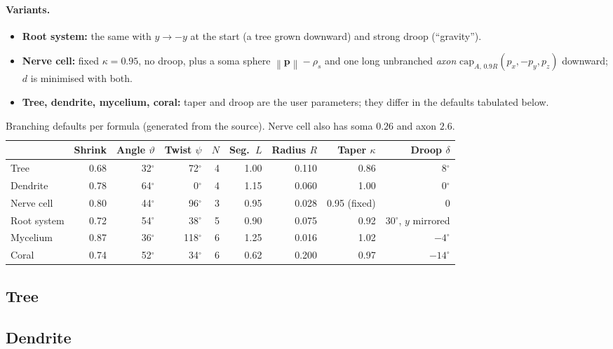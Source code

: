 \documentclass[10pt,a4paper]{article}
\newcommand{\vv}[1]{\mathbf{#1}}
\newcommand{\norm}[1]{\left\lVert#1\right\rVert}
\begin{document}
\paragraph{Variants.}
\begin{itemize}
\item \textbf{Root system:} the same with $y\to-y$ at the start (a tree grown downward) and strong droop (``gravity'').
\item \textbf{Nerve cell:} fixed $\kappa=0.95$, no droop, plus a soma sphere $\norm{\vv p}-\rho_s$ and one long unbranched \emph{axon} $\mathrm{cap}_{A,\,0.9R}(p_x,-p_y,p_z)$ downward; $d$ is minimised with both.
\item \textbf{Tree, dendrite, mycelium, coral:} taper and droop are the user parameters; they differ in the defaults tabulated below.
\end{itemize}

\begin{table}[H]\centering\footnotesize
\begin{tabular}{@{}lrrrrrrrr@{}}\toprule
 & Shrink & Angle $\vartheta$ & Twist $\psi$ & $N$ & Seg.\ $L$ & Radius $R$ & Taper $\kappa$ & Droop $\delta$\\\midrule
Tree & 0.68 & 32$^\circ$ & 72$^\circ$ & 4 & 1.00 & 0.110 & 0.86 & 8$^\circ$\\
Dendrite & 0.78 & 64$^\circ$ & 0$^\circ$ & 4 & 1.15 & 0.060 & 1.00 & 0$^\circ$\\
Nerve cell & 0.80 & 44$^\circ$ & 96$^\circ$ & 3 & 0.95 & 0.028 & 0.95 (fixed) & 0\\
Root system & 0.72 & 54$^\circ$ & 38$^\circ$ & 5 & 0.90 & 0.075 & 0.92 & 30$^\circ$, $y$ mirrored\\
Mycelium & 0.87 & 36$^\circ$ & 118$^\circ$ & 6 & 1.25 & 0.016 & 1.02 & $-4^\circ$\\
Coral & 0.74 & 52$^\circ$ & 34$^\circ$ & 6 & 0.62 & 0.200 & 0.97 & $-14^\circ$\\
\bottomrule\end{tabular}
\caption{Branching defaults per formula (generated from the source). Nerve cell also has soma $0.26$ and axon $2.6$.}
\end{table}

\subsection{Tree}
\subsection{Dendrite}
\end{document}
